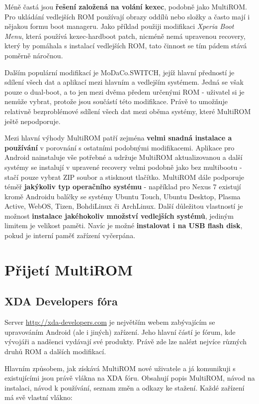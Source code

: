 \documentclass[12pt, a4paper, oneside]{article}
\newcommand{\B}{\textbf} %
\newcommand{\It}{\textit}  %
\begin{document}
Méně častá jsou \B{řešení založená na volání kexec}, podobně jako MultiROM. Pro ukládání vedlejších ROM používají obrazy oddílů nebo složky a často mají i nějakou formu boot manageru. Jako příklad použiji modifikaci \It{Xperia Boot Menu}\cite{xperia-boot-menu}, která používá kexec-hardboot patch, nicméně nemá upravenou recovery, který by pomáhala s instalací vedlejších ROM, tato činnost se tím pádem stává poměrně náročnou.

Dalším populární modifikací je MoDaCo.SWITCH\cite{modaco-switch}, jejíž hlavní předností je sdílení všech dat a aplikací mezi hlavním a vedlejším systémem. Jedná se však pouze o dual-boot, a to jen mezi dvěma předem určenými ROM - uživatel si je nemůže vybrat, protože jsou součástí této modifikace. Právě to umožňuje relativně bezproblémové sdílení všech dat mezi oběma systémy, které MultiROM ještě nepodporuje.

Mezi hlavní výhody MultiROM patří zejména \B{velmi snadná instalace a používání} v porovnání s ostatními podobnými modifikacemi. Aplikace pro Android nainstaluje vše potřebné a udržuje MultiROM aktualizovanou a další systémy se instalují v upravené recovery velmi podobně jako bez multibootu - stačí pouze vybrat ZIP soubor a stisknout tlačítko. MultiROM dále podporuje téměř \B{jakýkoliv typ operačního systému} - například pro Nexus 7 existují kromě Androidu balíčky se systémy Ubuntu Touch, Ubuntu Desktop, Plasma Active, WebOS, Tizen, BohdiLinux či ArchLinux. Další důležitou vlastností je možnost \B{instalace jakéhokoliv množství vedlejších systémů}, jediným limitem je velikost paměti. Navíc je možné \B{instalovat i na USB flash disk}, pokud je interní paměť zařízení vyčerpána.

\section{Přijetí MultiROM}
\subsection{XDA Developers fóra}
Server \url{http://xda-developers.com} je největším webem zabývajícím se upravováním Android (ale i jiných) zařízení. Jeho hlavní částí je fórum, kde vývojáři a nadšenci vydávají své produkty. Právě zde lze nalézt nejvíce různých druhů ROM a dalších modifikací.

Hlavním způsobem, jak získává MultiROM nové uživatele a já komunikuji s existujícími jsou právě vlákna na XDA fóru. Obsahují popis MultiROM, návod na instalaci, návod k používání, seznam změn a odkazy ke stažení. Každé zařízení má svě vlastní vlákno:
\end{document}
